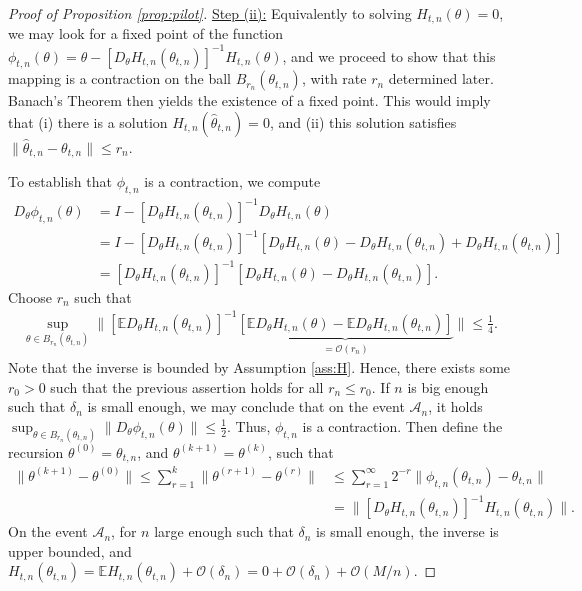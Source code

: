 \documentclass[10pt, a4paper]{article}
\theoremstyle{assumption}
\theoremstyle{definition}
\theoremstyle{theorem}
\newcommand{\E}{\mathbb{E}}
\begin{document}
\begin{proof}[Proof of Proposition \ref{prop:pilot}]
    \underline{Step (ii):} 
    Equivalently to solving $H_{t,n}(\theta)=0$, we may look for a fixed point of the function $\phi_{t,n}(\theta) = \theta-[D_\theta H_{t,n}(\theta_{t,n})]^{-1} H_{t,n}(\theta)$, and we proceed to show that this mapping is a contraction on the ball $B_{r_n}(\theta_{t,n})$, with rate $r_n$ determined later. 
    Banach's Theorem then yields the existence of a fixed point.
    This would imply that (i) there is a solution $H_{t,n}(\widehat{\theta}_{t,n})=0$, and (ii) this solution satisfies $\|\widehat{\theta}_{t,n}-\theta_{t,n}\|\leq r_n$.

    To establish that $\phi_{t,n}$ is a contraction, we compute
    \begin{align*}
        D_\theta \phi_{t,n}(\theta) 
        &= I - [D_\theta H_{t,n}(\theta_{t,n})]^{-1} D_\theta H_{t,n}(\theta) \\
        &= I -  [D_\theta H_{t,n}(\theta_{t,n})]^{-1} \left[D_\theta H_{t,n}(\theta)-D_\theta H_{t,n}(\theta_{t,n}) + D_\theta H_{t,n}(\theta_{t,n})\right] \\
        &= [D_\theta H_{t,n}(\theta_{t,n})]^{-1} \left[D_\theta H_{t,n}(\theta)-D_\theta H_{t,n}(\theta_{t,n})\right].
    \end{align*}
    Choose $r_n$ such that 
    \begin{align*}
        \sup_{\theta\in B_{r_n}(\theta_{t,n})} \Big\|\left[\E D_\theta H_{t,n}(\theta_{t,n}) \right]^{-1} \underbrace{\left[ \E D_\theta H_{t,n}(\theta)-\E D_\theta H_{t,n}(\theta_{t,n}) \right]}_{=\mathcal{O}(r_n)} \Big\| \leq \frac{1}{4} .
    \end{align*}
    Note that the inverse is bounded by Assumption \ref{ass:H}. 
    Hence, there exists some $r_0>0$ such that the previous assertion holds for all $r_n\leq r_0$.
    If $n$ is big enough such that $\delta_n$ is small enough, we may conclude that on the event $\mathcal{A}_n$, it holds $\sup_{\theta\in B_{r_n}(\theta_{t,n})}\|D_\theta \phi_{t,n}(\theta)\|\leq \frac{1}{2}$.
    Thus, $\phi_{t,n}$ is a contraction. 
    Then define the recursion $\theta^{(0)}=\theta_{t,n}$, and $\theta^{(k+1)}=\theta^{(k)}$, such that
    \begin{align*}
        \|\theta^{(k+1)} - \theta^{(0)}\| \leq \sum_{r=1}^k \|\theta^{(r+1)}-\theta^{(r)}\| 
        &\leq \sum_{r=1}^\infty 2^{-r} \|\phi_{t,n}(\theta_{t,n})-\theta_{t,n}\| \\
        &= \|[D_\theta H_{t,n}(\theta_{t,n})]^{-1} H_{t,n}(\theta_{t,n})\|.
    \end{align*}
    On the event $\mathcal{A}_n$, for $n$ large enough such that $\delta_n$ is small enough, the inverse is upper bounded, and $H_{t,n}(\theta_{t,n}) = \E H_{t,n}(\theta_{t,n}) + \mathcal{O}(\delta_n) = 0 + \mathcal{O}(\delta_n) + \mathcal{O}(M/n)$.

\end{proof}
\end{document}
